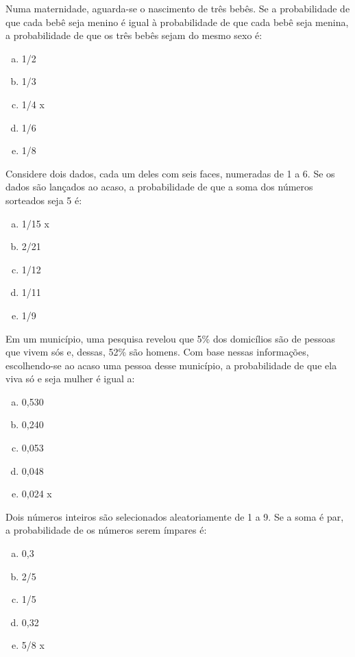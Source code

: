 \item Numa maternidade, aguarda-se o nascimento de três bebês. Se a probabilidade de que cada bebê seja menino é igual à probabilidade de que cada bebê seja menina, a probabilidade de que os três bebês sejam do mesmo sexo é:
\begin{multicols}{5}
\begin{enumerate}[a)]
	\item 1/2
	\item 1/3 
	\item 1/4 x
	\item 1/6  
	\item 1/8
\end{enumerate}
\end{multicols}

\item Considere dois dados, cada um deles com seis faces, numeradas de 1 a 6. Se os dados são lançados ao acaso, a probabilidade de que a soma dos números sorteados seja 5 é:
\begin{multicols}{5}
\begin{enumerate}[a)]
	\item 1/15  x
	\item 2/21
	\item 1/12
	\item 1/11
	\item 1/9
\end{enumerate}
\end{multicols}

\item Em um município, uma pesquisa revelou que 5\% dos domicílios são de pessoas que vivem sós e, dessas, 52\% são homens. Com base nessas informações, escolhendo-se ao acaso uma pessoa desse município, a probabilidade de que ela viva só e seja mulher é igual a:
\begin{multicols}{5}
\begin{enumerate}[a)]
	\item 0,530
	\item 0,240
	\item 0,053
	\item 0,048
	\item 0,024  x
\end{enumerate}
\end{multicols}

\item  Dois números inteiros são selecionados aleatoriamente de 1 a 9. Se a soma é par, a probabilidade de os números serem ímpares é:
\begin{multicols}{5}
\begin{enumerate}[a)]
	\item 0,3
	\item 2/5
	\item 1/5
	\item 0,32
	\item 5/8 x 
\end{enumerate}
\end{multicols}

